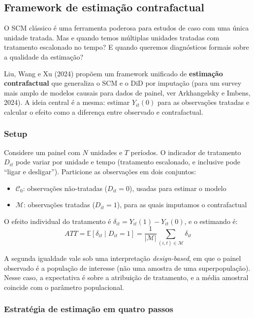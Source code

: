 \documentclass[
]{article}
\providecommand{\tightlist}{%
  \setlength{\itemsep}{0pt}\setlength{\parskip}{0pt}}
\begin{document}
\subsection{Framework de estimação contrafactual}\label{framework-de-estimauxe7uxe3o-contrafactual}

O SCM clássico é uma ferramenta poderosa para estudos de caso com uma única unidade tratada. Mas e quando temos múltiplas unidades tratadas com tratamento escalonado no tempo? E quando queremos diagnósticos formais sobre a qualidade da estimação?

Liu, Wang e Xu (2024) propõem um framework unificado de \textbf{estimação contrafactual} que generaliza o SCM e o DiD por imputação (para um survey mais amplo de modelos causais para dados de painel, ver Arkhangelsky e Imbens, 2024). A ideia central é a mesma: estimar \(Y_{it}(0)\) para as observações tratadas e calcular o efeito como a diferença entre observado e contrafactual.

\subsubsection{Setup}\label{setup}

Considere um painel com \(N\) unidades e \(T\) períodos. O indicador de tratamento \(D_{it}\) pode variar por unidade e tempo (tratamento escalonado, e inclusive pode ``ligar e desligar''). Particione as observações em dois conjuntos:

\begin{itemize}
\tightlist
\item
  \(\mathcal{C}_0\): observações não-tratadas (\(D_{it} = 0\)), usadas para estimar o modelo
\item
  \(\mathcal{M}\): observações tratadas (\(D_{it} = 1\)), para as quais imputamos o contrafactual
\end{itemize}

O efeito individual do tratamento é \(\delta_{it} = Y_{it}(1) - Y_{it}(0)\), e o estimando é:
\[
ATT = \mathbb{E}[\delta_{it} \mid D_{it} = 1] = \frac{1}{|\mathcal{M}|} \sum_{(i,t) \in \mathcal{M}} \delta_{it}
\]

A segunda igualdade vale sob uma interpretação \emph{design-based}, em que o painel observado é a população de interesse (não uma amostra de uma superpopulação). Nesse caso, a expectativa é sobre a atribuição de tratamento, e a média amostral coincide com o parâmetro populacional.

\subsubsection{Estratégia de estimação em quatro passos}\label{estratuxe9gia-de-estimauxe7uxe3o-em-quatro-passos}
\end{document}
